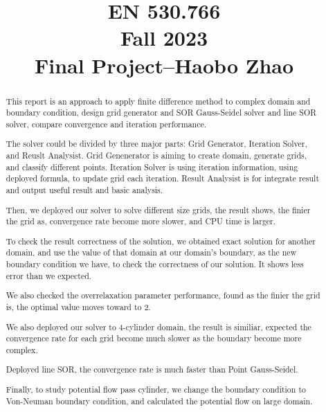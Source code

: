 \documentclass[12pt]{article}
\begin{document}
\title{EN 530.766\\Fall 2023\\Final Project–Haobo Zhao}
\maketitle

\begin{abstract}
    This report is an approach to apply finite difference method to complex domain and 
    boundary condition, design grid generator and SOR Gauss-Seidel solver and line SOR
    solver, compare convergence and iteration performance.

    The solver could be divided by three major parts: Grid Generator,
    Iteration Solver, and Reuslt Analysist. Grid Genenerator is aiming to create domain,
    generate grids, and classify different points. Iteration Solver is using iteration
    information, using deployed formula, to update grid each iteration. Result Analysist
    is for integrate result and output useful result and basic analysis.

    Then, we deployed our solver to solve different size grids, the result shows, the 
    finier the grid as, convergence rate become more slower, and CPU time is larger.

    To check the result correctness of the solution, we obtained exact solution for 
    another domain, and use the value of that domain at our domain's boundary, as the
    new boundary condition we have, to check the correctness of our solution. It shows
    less error than we expected.

    We also checked the overrelaxation parameter performance, found as the finier the
    grid is, the optimal value moves toward to 2. 


    We also deployed our solver to 4-cylinder domain, the result is similiar, expected
    the convergence rate for each grid become much slower as the boundary become more
    complex.

    Deployed line SOR, the convergence rate is much faster than Point Gauss-Seidel.

    Finally, to study potential flow pass cylinder, we change the boundary condition 
    to Von-Neuman boundary condition, and calculated the potential flow on large domain.




\end{abstract}
\end{document}
